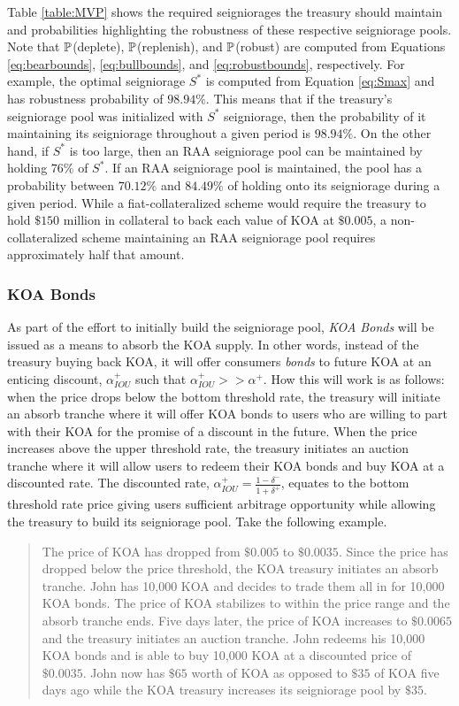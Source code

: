 Table \ref{table:MVP} shows the required seigniorages the treasury should maintain and probabilities highlighting the robustness of these respective seigniorage pools. Note that $\mathbb{P}$(deplete), $\mathbb{P}$(replenish), and $\mathbb{P}$(robust) are computed from Equations \ref{eq:bearbounds}, \ref{eq:bullbounds}, and \ref{eq:robustbounds}, respectively. For example, the optimal seigniorage $S^*$ is computed from Equation \ref{eq:Smax} and has robustness probability of $98.94\%$. This means that if the treasury's seigniorage pool was initialized with $S^*$ seigniorage, then the probability of it maintaining its seigniorage throughout a given period is $98.94\%$. On the other hand, if $S^*$ is too large, then an RAA seigniorage pool can be maintained by holding $76\%$ of $S^*$. If an RAA seigniorage pool is maintained, the pool has a probability between $70.12\%$ and $84.49\%$ of holding onto its seigniorage during a given period. While a fiat-collateralized scheme would require the treasury to hold $\$150$ million in collateral to back each value of KOA at $\$0.005$, a non-collateralized scheme maintaining an RAA seigniorage pool requires approximately half that amount.

\subsubsection{KOA Bonds}

As part of the effort to initially build the seigniorage pool, \textit{KOA Bonds} will be issued as a means to absorb the KOA supply. In other words, instead of the treasury buying back KOA, it will offer consumers \textit{bonds} to future KOA at an enticing discount, $\alpha^+_{IOU}$ such that $\alpha^+_{IOU} >> \alpha^+$. How this will work is as follows: when the price drops below the bottom threshold rate, the treasury will initiate an absorb tranche where it will offer KOA bonds to users who are willing to part with their KOA for the promise of a discount in the future. When the price increases above the upper threshold rate, the treasury initiates an auction tranche where it will allow users to redeem their KOA bonds and buy KOA at a discounted rate. The discounted rate, $\alpha^+_{IOU} = \frac{1 - \delta^-}{1+\delta^+}$, equates to the bottom threshold rate price giving users sufficient arbitrage opportunity while allowing the treasury to build its seigniorage pool. Take the following example.
%
\begin{quote}
The price of KOA has dropped from $\$0.005$ to $\$0.0035$. Since the price has dropped below the price threshold, the KOA treasury initiates an absorb tranche. John has 10,000 KOA and decides to trade them all in for 10,000 KOA bonds. The price of KOA stabilizes to within the price range and the absorb tranche ends. Five days later, the price of KOA increases to $\$0.0065$ and the treasury initiates an auction tranche. John redeems his 10,000 KOA bonds and is able to buy 10,000 KOA at a discounted price of $\$0.0035$. John now has $\$65$ worth of KOA as opposed to $\$35$ of KOA five days ago while the KOA treasury increases its seigniorage pool by $\$35$.
\end{quote}


